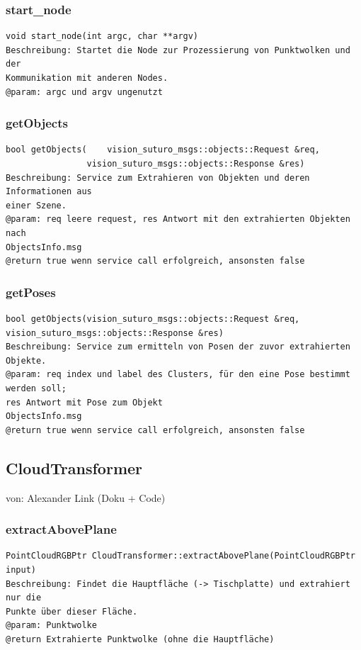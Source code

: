 \documentclass{suturo}
\makeatletter
\newcommand{\chapterauthor}[1]{%
  {\parindent0pt\vspace*{-27pt}%
  \linespread{0}\small\begin{flushright}von: #1\end{flushright}%
  \par\nobreak\vspace*{0pt}}
  \@afterheading%
}
\makeatother
\begin{document}
\subsubsection{start\_node}
\begin{verbatim}
void start_node(int argc, char **argv)
Beschreibung: Startet die Node zur Prozessierung von Punktwolken und der
Kommunikation mit anderen Nodes.
@param: argc und argv ungenutzt
\end{verbatim}\label{func:startnode}
\subsubsection{getObjects}
\begin{verbatim}
bool getObjects(	vision_suturo_msgs::objects::Request &req, 
			    vision_suturo_msgs::objects::Response &res)
Beschreibung: Service zum Extrahieren von Objekten und deren Informationen aus
einer Szene.
@param: req leere request, res Antwort mit den extrahierten Objekten nach
ObjectsInfo.msg
@return true wenn service call erfolgreich, ansonsten false
\end{verbatim}\label{func:getobjects}

\subsubsection{getPoses}
\begin{verbatim}
bool getObjects(vision_suturo_msgs::objects::Request &req, 
vision_suturo_msgs::objects::Response &res)
Beschreibung: Service zum ermitteln von Posen der zuvor extrahierten Objekte.
@param: req index und label des Clusters, für den eine Pose bestimmt werden soll; 
res Antwort mit Pose zum Objekt
ObjectsInfo.msg
@return true wenn service call erfolgreich, ansonsten false
\end{verbatim}\label{func:getposes}



\subsection*{CloudTransformer}
\chapterauthor{Alexander Link (Doku + Code)}

\subsubsection{extractAbovePlane}
\begin{verbatim}
PointCloudRGBPtr CloudTransformer::extractAbovePlane(PointCloudRGBPtr input)
Beschreibung: Findet die Hauptfläche (-> Tischplatte) und extrahiert nur die
Punkte über dieser Fläche.
@param: Punktwolke
@return Extrahierte Punktwolke (ohne die Hauptfläche)
\end{verbatim}\label{func:extractaboveplane}
\end{document}
